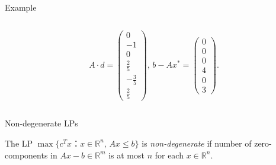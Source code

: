 \begin{frame}{Example}
\begin{columns}[t]
\begin{column}{.5\textwidth}
\begin{displaymath}
  A ⋅ d = \begin{pmatrix}0\\-1\\0\\\frac{2}{5}\\- \frac{3}{5}\\\frac{2}{5}\end{pmatrix}, \, 
  b-Ax^* = 
\begin{pmatrix}0\\0\\0\\4\\0\\3\end{pmatrix}.
\end{displaymath}

    \end{column}       
  \end{columns}
\end{frame}


\begin{frame}{}
  
\end{frame}


\begin{frame}{Non-degenerate LPs}

  \begin{definition}
    The LP $\max\{c^Tx ： x ∈ ℝ^n, \, Ax≤b\}$ is \emph{non-degenerate} if number of zero-components in $Ax-b ∈ ℝ^m$ is at most  $n$ for each $x ∈ ℝ^n$. 
  \end{definition}
  
  \begin{columns}
    \begin{column}{.5\textwidth}
      
    \end{column}
    \begin{column}{.5\textwidth}
      
    \end{column}       
  \end{columns}
\end{frame}




